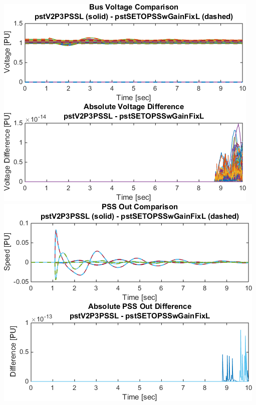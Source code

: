 \documentclass[12pt]{article}
\begin{document}
\includegraphics[width=.5\linewidth]{pstV2P3PSSLpstSETOPSSwGainFixLBusV} %
\includegraphics[width=.5\linewidth]{pstV2P3PSSLpstSETOPSSwGainFixLPSSout}
\end{document}
